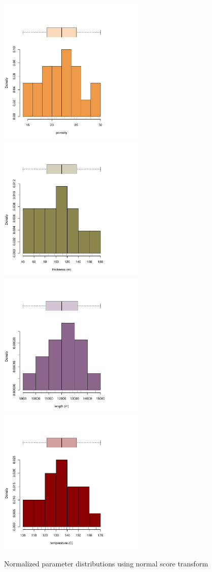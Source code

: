 \documentclass[review,authoryear, 12pt]{elsarticle}\usepackage[]{graphicx}\usepackage[]{color}
\newenvironment{knitrout}{}{} %
\begin{document}
\begin{knitrout}
\color{fgcolor}\begin{figure}[]

\includegraphics[width=7cm,height=7cm]{figure/BoxCoxhistplots1} 
\includegraphics[width=7cm,height=7cm]{figure/BoxCoxhistplots2} 
\includegraphics[width=7cm,height=7cm]{figure/BoxCoxhistplots3} 
\includegraphics[width=7cm,height=7cm]{figure/BoxCoxhistplots4} \caption[Normalized parameter distributions using normal score transform]{Normalized parameter distributions using normal score transform\label{Fig:BoxCoxhistplots}}

\end{figure}
\end{knitrout}
\end{document}

